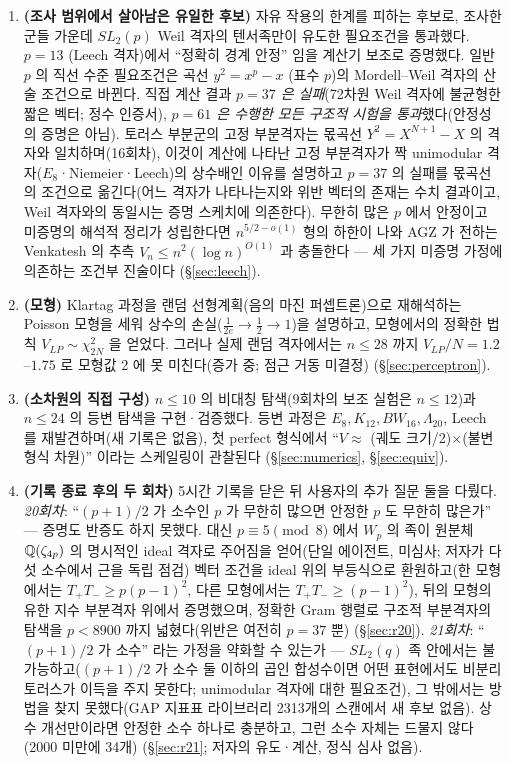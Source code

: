 \begin{itemize}
\begin{enumerate}
 \item \textbf{(조사 범위에서 살아남은 유일한 후보)} 자유 작용의 한계를 피하는 후보로, 조사한 군들 가운데 $SL_2(p)$ Weil 격자의 텐서족만이 유도한 필요조건을 통과했다. $p=13$ (Leech 격자)에서 ``정확히 경계 안정'' 임을 계산기 보조로 증명했다. 일반 $p$ 의 직선 수준 필요조건은 곡선 $y^2=x^p-x$ (표수 $p$)의 Mordell--Weil 격자의 산술 조건으로 바뀐다. 직접 계산 결과 \emph{$p=37$ 은 실패}(72차원 Weil 격자에 불균형한 짧은 벡터; 정수 인증서), \emph{$p=61$ 은 수행한 모든 구조적 시험을 통과}했다(안정성의 증명은 아님). 토러스 부분군의 고정 부분격자는 몫곡선 $Y^2=X^{N+1}-X$ 의 격자와 일치하며(16회차), 이것이 계산에 나타난 고정 부분격자가 짝 unimodular 격자($E_8$·Niemeier·Leech)의 상수배인 이유를 설명하고 $p=37$ 의 실패를 몫곡선의 조건으로 옮긴다(어느 격자가 나타나는지와 위반 벡터의 존재는 수치 결과이고, Weil 격자와의 동일시는 증명 스케치에 의존한다). 무한히 많은 $p$ 에서 안정이고 미증명의 해석적 정리가 성립한다면 $n^{5/2-o(1)}$ 형의 하한이 나와 AGZ 가 전하는 Venkatesh 의 추측 $V_n\le n^2(\log n)^{O(1)}$ 과 충돌한다 --- 세 가지 미증명 가정에 의존하는 조건부 진술이다 (\S\ref{sec:leech}).
 \item \textbf{(모형)} Klartag 과정을 랜덤 선형계획(음의 마진 퍼셉트론)으로 재해석하는 Poisson 모형을 세워 상수의 손실($\tfrac1{2e}\to\tfrac12\to1$)을 설명하고, 모형에서의 정확한 법칙 $V_{LP}\sim\chi^2_{2N}$ 을 얻었다. 그러나 실제 랜덤 격자에서는 $n\le28$ 까지 $V_{LP}/N=1.2$--$1.75$ 로 모형값 2 에 못 미친다(증가 중; 점근 거동 미결정) (\S\ref{sec:perceptron}).
 \item \textbf{(소차원의 직접 구성)} $n\le10$ 의 비대칭 탐색(9회차의 보조 실험은 $n\le12$)과 $n\le24$ 의 등변 탐색을 구현·검증했다. 등변 과정은 $E_8,K_{12},BW_{16},\Lambda_{20}$, Leech 를 재발견하며(새 기록은 없음), 첫 perfect 형식에서 ``$V\approx$ (궤도 크기/2)$\times$(불변형식 차원)'' 이라는 스케일링이 관찰된다 (\S\ref{sec:numerics}, \S\ref{sec:equiv}).
 \item \textbf{(기록 종료 후의 두 회차)} 5시간 기록을 닫은 뒤 사용자의 추가 질문 둘을 다뤘다. \emph{20회차}: ``$(p+1)/2$ 가 소수인 $p$ 가 무한히 많으면 안정한 $p$ 도 무한히 많은가'' --- 증명도 반증도 하지 못했다. 대신 $p\equiv5\pmod8$ 에서 $W_p$ 의 족이 원분체 $\mathbb{Q}(\zeta_{4p})$ 의 명시적인 ideal 격자로 주어짐을 얻어(단일 에이전트, 미심사; 저자가 다섯 소수에서 근을 독립 점검) 벡터 조건을 ideal 위의 부등식으로 환원하고(한 모형에서는 $T_+T_-\ge p(p-1)^2$, 다른 모형에서는 $T_+T_-\ge(p-1)^2$), 뒤의 모형의 유한 지수 부분격자 위에서 증명했으며, 정확한 Gram 행렬로 구조적 부분격자의 탐색을 $p<8900$ 까지 넓혔다(위반은 여전히 $p=37$ 뿐) (\S\ref{sec:r20}). \emph{21회차}: ``$(p+1)/2$ 가 소수'' 라는 가정을 약화할 수 있는가 --- $SL_2(q)$ 족 안에서는 불가능하고($(p+1)/2$ 가 소수 둘 이하의 곱인 합성수이면 어떤 표현에서도 비분리 토러스가 이득을 주지 못한다; unimodular 격자에 대한 필요조건), 그 밖에서는 방법을 찾지 못했다(GAP 지표표 라이브러리 2313개의 스캔에서 새 후보 없음). 상수 개선만이라면 안정한 소수 하나로 충분하고, 그런 소수 자체는 드물지 않다(2000 미만에 34개) (\S\ref{sec:r21}; 저자의 유도·계산, 정식 심사 없음).
 \end{enumerate}
\end{itemize}

